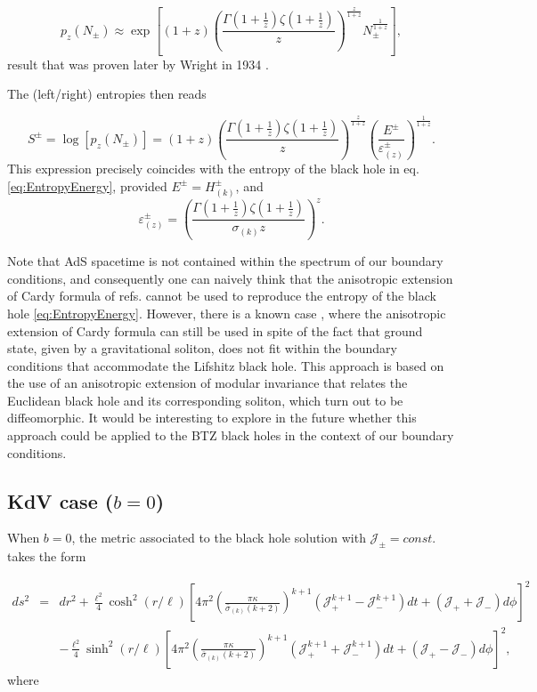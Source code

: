 \documentclass[letterpaper,11pt,oneside]{book}
\begin{document}
\[
p_{z}\left(N_{\pm}\right)\approx\exp\left[\left(1+z\right)\left(\frac{\Gamma\left(1+\frac{1}{z}\right)\zeta\left(1+\frac{1}{z}\right)}{z}\right)^{\frac{z}{1+z}}N_{\pm}^{\frac{1}{1+z}}\right],
\]
result that was proven later by Wright in 1934 \cite{wright1934asymptotic}.

The (left/right) entropies then reads

\begin{equation}
	S^{\pm}=\log\left[p_{z}\left(N_{\pm}\right)\right]=\left(1+z\right)\left(\frac{\Gamma\left(1+\frac{1}{z}\right)\zeta\left(1+\frac{1}{z}\right)}{z}\right)^{\frac{z}{1+z}}\left(\frac{E^{\pm}}{\varepsilon_{\left(z\right)}^{\pm}}\right)^{\frac{1}{1+z}}.\label{eq:EntropyWright}
\end{equation}
This expression precisely coincides with the entropy of the black
hole in eq. \eqref{eq:EntropyEnergy}, provided $E^{\pm}=H_{\left(k\right)}^{\pm}$,
and
\[
\varepsilon_{\left(z\right)}^{\pm}=\left(\frac{\Gamma\left(1+\frac{1}{z}\right)\zeta\left(1+\frac{1}{z}\right)}{\sigma_{\left(k\right)}z}\right)^{z}.
\]

Note that AdS spacetime is not contained within the spectrum of our
boundary conditions, and consequently one can naively think that the
anisotropic extension of Cardy formula of refs. \cite{Gonzalez:2011nz,Perez:2016vqo}
cannot be used to reproduce the entropy of the black hole \eqref{eq:EntropyEnergy}.
However, there is a known case \cite{Gonzalez:2011nz}, where the
anisotropic extension of Cardy formula can still be used in spite
of the fact that ground state, given by a gravitational soliton, does
not fit within the boundary conditions that accommodate the Lifshitz
black hole. This approach is based on the use of an anisotropic extension
of modular invariance that relates the Euclidean black hole and its
corresponding soliton, which turn out to be diffeomorphic. It would
be interesting to explore in the future whether this approach could
be applied to the BTZ black holes in the context of our boundary conditions.

\subsection{KdV case ($b=0$)}

When $b=0$, the metric associated to the black hole solution with
$\mathcal{J_{\pm}}=const.$ takes the form

\begin{equation}
	\begin{array}{ccc}
		ds^{2} & = & dr^{2}+\frac{\ell^{2}}{4}\cosh^{2}\left(r/\ell\right)\left[4\pi^{2}\left(\frac{\pi\kappa}{\bar{\sigma}_{\left(k\right)}\left(k+2\right)}\right)^{k+1}\left(\mathcal{J}_{+}^{k+1}-\mathcal{J}_{-}^{k+1}\right)dt+\left(\mathcal{J}_{+}+\mathcal{J}_{-}\right)d\phi\right]^{2}\\
		&  & -\frac{\ell^{2}}{4}\sinh^{2}\left(r/\ell\right)\left[4\pi^{2}\left(\frac{\pi\kappa}{\bar{\sigma}_{\left(k\right)}\left(k+2\right)}\right)^{k+1}\left(\mathcal{J}_{+}^{k+1}+\mathcal{J}_{-}^{k+1}\right)dt+\left(\mathcal{J}_{+}-\mathcal{J}_{-}\right)d\phi\right]^{2},
	\end{array}\label{eq:metriccompleta-1-1}
\end{equation}
where
\end{document}
